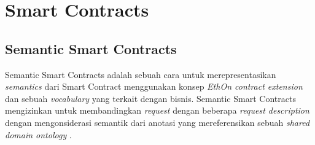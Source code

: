 \section{Smart Contracts}
\label{sec:smart-contract}





% 





\subsection{Semantic Smart Contracts}
\label{subsec:semantic-smart-contracts}
Semantic Smart Contracts adalah sebuah cara untuk merepresentasikan \textit{semantics} dari Smart Contract menggunakan konsep \textit{EthOn contract extension} dan sebuah \textit{vocabulary} yang terkait dengan bisnis. Semantic Smart Contracts mengizinkan untuk membandingkan \textit{request} dengan beberapa \textit{request description} dengan mengonsiderasi semantik dari anotasi yang mereferensikan sebuah \textit{shared domain ontology} \parencite{baqa2019semantic}.

